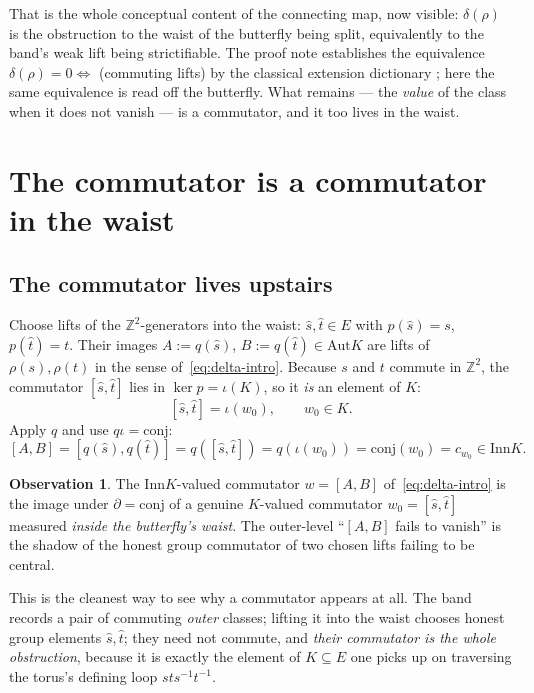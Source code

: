 \documentclass[11pt]{article}
\theoremstyle{definition}
\newtheorem{observation}[theorem]{Observation}
\newcommand{\Z}{\mathbb{Z}}
\newcommand{\Aut}{\mathrm{Aut}}
\newcommand{\Inn}{\mathrm{Inn}}
\newcommand{\conj}{\mathrm{conj}}
\begin{document}
That is the whole conceptual content of the connecting map, now visible: $\delta(\rho)$ is the
obstruction to the waist of the butterfly being split, equivalently to the band's weak lift being
strictifiable. The proof note establishes the equivalence $\delta(\rho)=0\iff$ (commuting lifts)
by the classical extension dictionary \cite{brown,eml}; here the same equivalence is read off the
butterfly. What remains --- the \emph{value} of the class when it does not vanish --- is a
commutator, and it too lives in the waist.

\section{The commutator is a commutator in the waist}\label{sec:commutator}

\subsection{The commutator lives upstairs}

Choose lifts of the $\Z^2$-generators into the waist: $\hat s,\hat t\in E$ with $p(\hat s)=s$,
$p(\hat t)=t$. Their images $A:=q(\hat s)$, $B:=q(\hat t)\in\Aut K$ are lifts of
$\rho(s),\rho(t)$ in the sense of~\eqref{eq:delta-intro}. Because $s$ and $t$ commute in $\Z^2$,
the commutator $[\hat s,\hat t]$ lies in $\ker p=\iota(K)$, so it \emph{is} an element of $K$:
\begin{equation}\label{eq:comm-upstairs}
[\hat s,\hat t]=\iota(w_0),\qquad w_0\in K.
\end{equation}
Apply $q$ and use $q\iota=\conj$:
\begin{equation}\label{eq:comm-down}
[A,B]=[q(\hat s),q(\hat t)]=q([\hat s,\hat t])=q(\iota(w_0))=\conj(w_0)=c_{w_0}\in\Inn K.
\end{equation}

\begin{observation}\label{obs:commutator}
The $\Inn K$-valued commutator $w=[A,B]$ of~\eqref{eq:delta-intro} is the image under
$\partial=\conj$ of a genuine $K$-valued commutator $w_0=[\hat s,\hat t]$ measured \emph{inside the
butterfly's waist}. The outer-level ``$[A,B]$ fails to vanish'' is the shadow of the honest group
commutator of two chosen lifts failing to be central.
\end{observation}

This is the cleanest way to see why a commutator appears at all. The band records a pair of
commuting \emph{outer} classes; lifting it into the waist chooses honest group elements
$\hat s,\hat t$; they need not commute, and \emph{their commutator is the whole obstruction},
because it is exactly the element of $K\subseteq E$ one picks up on traversing the torus's defining
loop $sts^{-1}t^{-1}$.
\end{document}
